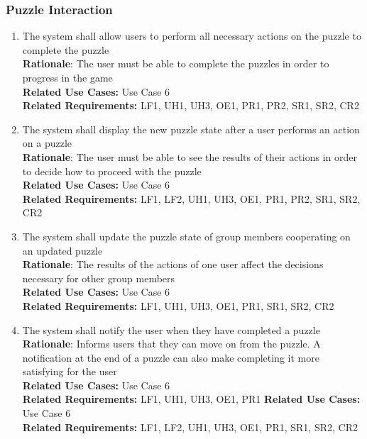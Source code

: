 \documentclass[12pt]{article}
\begin{document}
\subsubsection{Puzzle Interaction}
    \begin{enumerate}[label=PI\arabic*., series=PuzzleInteract]
        \item The system shall allow users to perform all necessary actions on the puzzle to complete the puzzle\\
        \textbf{Rationale}: The user must be able to complete the puzzles in order to progress in the game\\
        \textbf{Related Use Cases:} Use Case 6\\
        \textbf{Related Requirements:} LF1, UH1, UH3, OE1, PR1, PR2, SR1, SR2, CR2
        \item The system shall display the new puzzle state after a user performs an action on a puzzle\\
        \textbf{Rationale}: The user must be able to see the results of their actions in order to decide how to proceed with the puzzle\\
        \textbf{Related Use Cases:} Use Case 6\\
        \textbf{Related Requirements:} LF1, LF2, UH1, UH3, OE1, PR1, PR2, SR1, SR2, CR2
        \item The system shall update the puzzle state of group members cooperating on an updated puzzle\\
        \textbf{Rationale}: The results of the actions of one user affect the decisions necessary for other group members\\
        \textbf{Related Use Cases:} Use Case 6\\
        \textbf{Related Requirements:} LF1, UH1, UH3, OE1, PR1, SR1, SR2, CR2
        \item The system shall notify the user when they have completed a puzzle\\
        \textbf{Rationale}: Informs users that they can move on from the puzzle. A notification at the end of a puzzle can also make completing it more satisfying for the user\\
        \textbf{Related Use Cases:} Use Case 6\\
        \textbf{Related Requirements:} LF1, UH1, UH3, OE1, PR1
        \textbf{Related Use Cases:} Use Case 6\\
        \textbf{Related Requirements:} LF1, LF2, UH1, UH3, OE1, PR1, SR1, SR2, CR2
    \end{enumerate}
\end{document}
